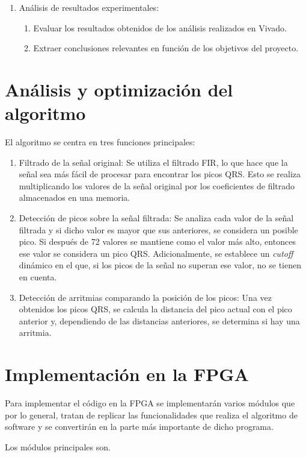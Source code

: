 \begin{enumerate}
	\item Análisis de resultados experimentales:
	\begin{enumerate}
		\item Evaluar los resultados obtenidos de los análisis realizados en Vivado.

		\item Extraer conclusiones relevantes en función de los objetivos del proyecto.
	\end{enumerate}
\end{enumerate}

\section{Análisis y optimización del algoritmo}
El algoritmo se centra en tres funciones principales:
\begin{enumerate}
\item Filtrado de la señal original: Se utiliza el filtrado FIR\cite{FIR}, lo que hace que la señal sea más fácil de procesar para encontrar los picos QRS. Esto se realiza multiplicando los valores de la señal original por los coeficientes de filtrado almacenados en una memoria.
\item Detección de picos sobre la señal filtrada: Se analiza cada valor de la señal filtrada y si dicho valor es mayor que sus anteriores, se considera un posible pico. Si después de 72 valores se mantiene como el valor más alto, entonces ese valor se considera un pico QRS. Adicionalmente, se establece un \textit{cutoff} dinámico en el que, si los picos de la señal no superan ese valor, no se tienen en cuenta.
\item Detección de arritmias comparando la posición de los picos: Una vez obtenidos los picos QRS, se calcula la distancia del pico actual con el pico anterior y, dependiendo de las distancias anteriores, se determina si hay una arritmia.
\end{enumerate}

\section{Implementación en la FPGA}
Para implementar el código en la FPGA se implementarán varios módulos que por lo general, tratan de replicar las funcionalidades que realiza el algoritmo de software y se convertirán en la parte más importante de dicho programa.  

Los módulos principales son.

